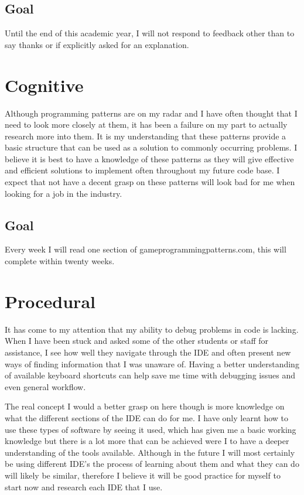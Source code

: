 \documentclass{scrartcl}
\begin{document}
\subsection{Goal}
Until the end of this academic year, I will not respond to feedback other than to say thanks or if explicitly asked for an explanation.

\section{Cognitive}
Although programming patterns are on my radar and I have often thought that I need to look more closely at them, it has been a failure on my part to actually research more into them. It is my understanding that these patterns provide a basic structure that can be used as a solution to commonly occurring problems. I believe it is best to have a knowledge of these patterns as they will give effective and efficient solutions to implement often throughout my future code base. I expect that not have a decent grasp on these patterns will look bad for me when looking for a job in the industry.
\subsection{Goal}
Every week I will read one section of gameprogrammingpatterns.com, this will complete within twenty weeks.

\section{Procedural}
It has come to my attention that my ability to debug problems in code is lacking. When I have been stuck and asked some of the other students or staff for assistance, I see how well they navigate through the IDE and often present new ways of finding information that I was unaware of. Having a better understanding of available keyboard shortcuts can help save me time with debugging issues and even general workflow. 

The real concept I would a better grasp on here though is more knowledge on what the different sections of the IDE can do for me. I have only learnt how to use these types of software by seeing it used, which has given me a basic working knowledge but there is a lot more that can be achieved were I to have a deeper understanding of the tools available. Although in the future I will most certainly be using different IDE's the process of learning about them and what they can do will likely be similar, therefore I believe it will be good practice for myself to start now and research each IDE that I use.
\end{document}
